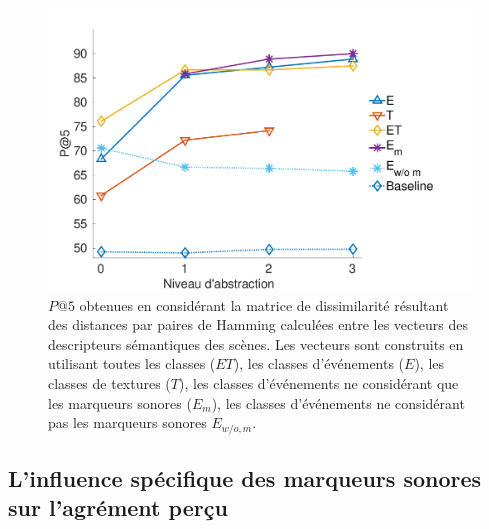 \begin{figure}[t]
        \myfloatalign
        \includegraphics[width=.8\linewidth]{gfx/ch_5/pa5_1}
       \caption[$P@5$ obtenues en considérant la matrice de dissimilarité résultant des distances par paires de Hamming calculées entre les vecteurs des descripteurs sémantiques des scènes.]{$P@5$ obtenues en considérant la matrice de dissimilarité résultant des distances par paires de Hamming calculées entre les vecteurs des descripteurs sémantiques des scènes. Les vecteurs sont construits en utilisant toutes les classes ($ET$), les classes d'événements ($E$), les classes de textures ($T$), les classes d'événements ne considérant que les marqueurs sonores ($E_m$), les classes d'événements ne considérant pas les marqueurs sonores $E_{w/o,m}$.}\label{fig:pa5}
\end{figure}

\subsection[Marqueurs sonores et agrément perçu]{L'influence spécifique des marqueurs sonores sur l'agrément perçu}


